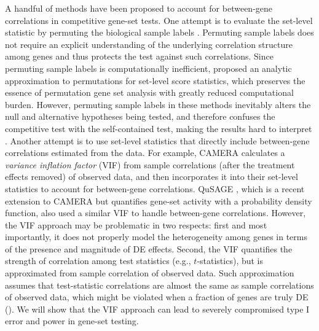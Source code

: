 	A handful of methods have been proposed to account for between-gene correlations in competitive 
	gene-set tests. One attempt is to evaluate the set-level statistic by permuting the biological 
	sample labels \citep{efron2007testing,subramanian2005gene}. Permuting sample labels
	does not require an explicit understanding of the underlying correlation structure among genes 
	and thus protects the test against such correlations. Since permuting sample labels is 
	computationally	inefficient, \citet{zhou2013empirical} proposed an analytic approximation to 
	permutations for set-level score statistics, which preserves the essence of permutation gene 
	set analysis with greatly reduced computational burden. However, permuting sample labels in 
	these methods inevitably alters the null and alternative hypotheses being tested, and therefore 
	confuses the competitive test with the self-contained test, making the results hard to interpret
	\citep{goeman2007analyzing, khatri2012ten, wu2012camera}. Another attempt is to use set-level
	statistics that directly include between-gene correlations estimated from the data. For 
	example, CAMERA \citep{wu2012camera} calculates a \textit{variance inflation factor} (VIF) from 
	sample correlations (after the treatment effects removed) of observed data, and then 
	incorporates it into their set-level statistics to account for between-gene correlations. 
	QuSAGE \citep{yaari2013quantitative}, which is a recent	extension to CAMERA but quantifies 
	gene-set activity with a probability density function, also used a similar VIF to handle 
	between-gene correlations. However, the VIF approach may be problematic in two respects: first 
	and most importantly, it does not properly model the heterogeneity among genes in 
	terms of the presence and magnitude of DE effects. Second, the VIF quantifies the strength of 
	correlation among test statistics (e.g., 
	$t$-statistics), but is approximated from sample correlation of observed 
	data. Such approximation assumes that test-statistic correlations are almost the same as sample 
	correlations of observed data, which might be violated when a fraction of 
	genes are  truly DE (\thepapertobefinished). We will show that the VIF approach can lead to 
	severely compromised type I error and power in gene-set testing. 
	

